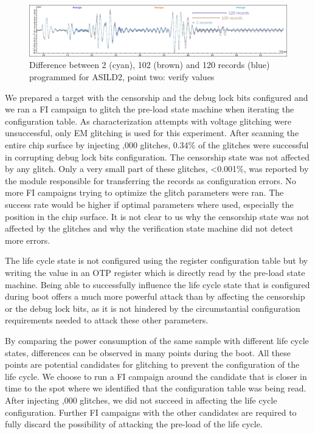 \documentclass[10pt, conference, compsocconf]{IEEEtran}
\newcommand{\ST}{ASILD2\xspace}
\begin{document}
\begin{figure}[!t]
  \centering
  \includegraphics[width=\textwidth]{spc570-DPA-records-2}
  \caption{Difference between 2 (cyan), 102 (brown) and 120 records (blue) programmed for \ST, point two: verify values}
  \label{fig:jtag-st-2}
\end{figure}

We prepared a target with the censorship and the debug lock bits configured and we ran a FI campaign to glitch the pre-load state machine when iterating the configuration table. As characterization attempts with voltage glitching were unsuccessful, only EM glitching is used for this experiment. After scanning the entire chip surface by injecting ,000 glitches, 0.34\% of the glitches were successful in corrupting debug lock bits configuration. The censorship state was not affected by any glitch. Only a very small part of these glitches, \textless0.001\%, was reported by the module responsible for transferring the records as configuration errors. No more FI campaigns trying to optimize the glitch parameters were ran. The success rate would be higher if optimal parameters where used, especially the position in the chip surface. It is not clear to us why the censorship state was not affected by the glitches and why the verification state machine did not detect more errors.

The life cycle state is not configured using the register configuration table but by writing the value in an OTP register which is directly read by the pre-load state machine. Being able to successfully influence the life cycle state that is configured during boot offers a much more powerful attack than by affecting the censorship or the debug lock bits, as it is not hindered by the circumstantial configuration requirements needed to attack these other parameters.

By comparing the power consumption of the same sample with different life cycle states, differences can be observed in many points during the boot. All these points are potential candidates for glitching to prevent the configuration of the life cycle. We choose to run a FI campaign around the candidate that is closer in time to the spot where we identified that the configuration table was being read. After injecting ,000 glitches, we did not succeed in affecting the life cycle configuration. Further FI campaigns with the other candidates are required to fully discard the possibility of attacking the pre-load of the life cycle.
\end{document}
